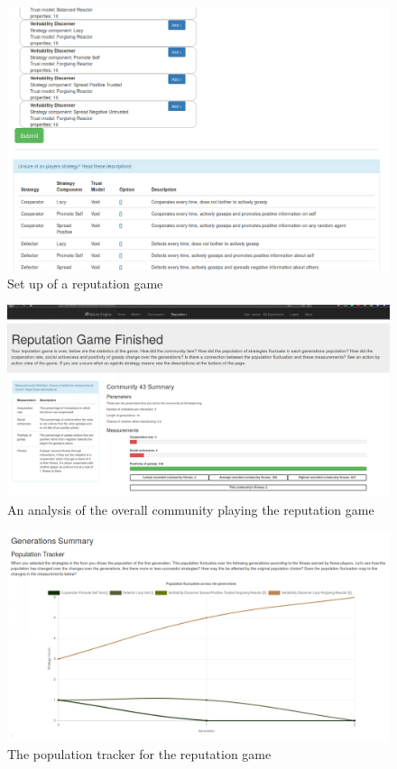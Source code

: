 \documentclass[]{final_report}
\begin{document}
\begin{figure}
	\includegraphics[width=\textwidth]{repSetup2.png}
	\caption{Set up of a reputation game}
	\label{fig:rep_setup2}
\end{figure}
\begin{figure}
	\includegraphics[width=\textwidth]{RepCommAnalysis.png}
	\caption{An analysis of the overall community playing the reputation game}
	\label{fig:rep_comm_analysis}
\end{figure}
\begin{figure}
	\includegraphics[width=\textwidth]{RepPopTrack.png}
	\caption{The population tracker for the reputation game}
	\label{fig:rep_pop_tracker}
\end{figure}
\end{document}
